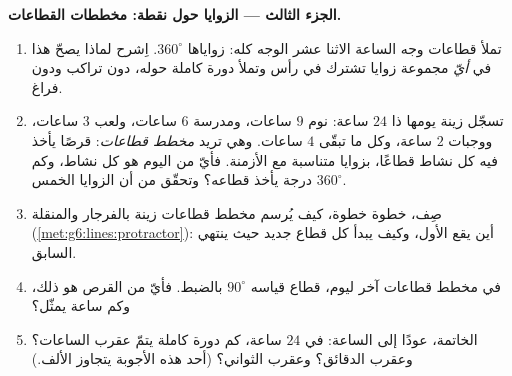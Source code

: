 \begin{problem}
\medskip
\noindent\textbf{الجزء الثالث --- الزوايا حول نقطة: مخططات
القطاعات.}
\begin{enumerate}[resume]
  \item تملأ قطاعات وجه الساعة الاثنا عشر الوجه
        كله:  زواياها $360^\circ$. اِشرح لماذا
        يصحّ هذا في \emph{أيّ} مجموعة زوايا
        تشترك في رأس وتملأ دورة كاملة حوله، دون
        تراكب ودون فراغ.
  \item تسجّل زينة يومها ذا $24$ ساعة: نوم $9$ ساعات، ومدرسة
        $6$ ساعات، ولعب $3$ ساعات، ووجبات $2$ ساعة، وكل ما تبقّى $4$ ساعات.
        وهي تريد \emph{مخطط قطاعات}: قرصًا يأخذ فيه كل نشاط
        قطاعًا، بزوايا متناسبة مع الأزمنة.
        فأيّ  من اليوم هو كل نشاط، وكم
        درجة يأخذ قطاعه؟ وتحقّق من أن  الزوايا الخمس
        $360^\circ$.
  \item صِف، خطوة خطوة، كيف يُرسم مخطط قطاعات زينة
        بالفرجار والمنقلة
        (\cref{met:g6:lines:protractor}): أين يقع 
        الأول، وكيف يبدأ كل قطاع جديد حيث ينتهي
        السابق.
  \item في مخطط قطاعات آخر ليوم، قطاع قياسه
        $90^\circ$ بالضبط. فأيّ  من القرص هو ذلك،
        وكم ساعة يمثّل؟
  \item الخاتمة، عودًا إلى الساعة: في $24$ ساعة، كم
        دورة كاملة يتمّ عقرب الساعات؟ وعقرب الدقائق؟ وعقرب
        الثواني؟ (أحد هذه الأجوبة يتجاوز الألف.)
\end{enumerate}
\end{problem}
